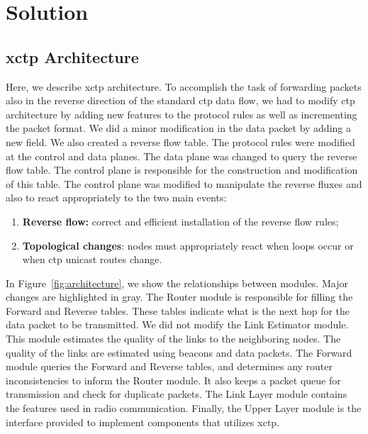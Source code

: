 \section{Solution}
\label{sec:solution}


\subsection{\ac{xctp} Architecture}
\label{sec:architecture}

Here, we describe \ac{xctp} architecture. To accomplish the task of forwarding packets also in the reverse direction of the standard \ac{ctp} data flow, we had to modify \ac{ctp} architecture by adding new features to the protocol rules as well as incrementing the packet format. We did a minor modification in the data packet by adding a new field. We also created a reverse flow table. The protocol rules were modified at the control and data planes. The data plane was changed to query the reverse flow table. The control plane is responsible for the construction and modification of this table. The control plane was modified to manipulate the reverse fluxes and also to react appropriately to the two main events:

\begin{enumerate}
     \item \textbf {Reverse flow:} correct and efficient installation of the reverse flow rules;
     \item \textbf {Topological changes}: nodes must appropriately react when loops occur or when \ac{ctp} unicast routes change.
\end{enumerate}

In Figure~\ref{fig:architecture}, we show the relationships between modules. Major changes are highlighted in gray. The Router module is responsible for filling the Forward and Reverse tables. These tables indicate what is the next hop for the data packet to be transmitted. We did not modify the Link Estimator module. This module estimates the quality of the links to the neighboring nodes. The quality of the links are estimated using beacons and data packets. The Forward module queries the Forward and Reverse tables, and determines any router inconsistencies to inform the Router module. It also keeps a packet queue for transmission and check for duplicate packets. The Link Layer module contains the features used in radio communication. Finally, the Upper Layer module is the interface provided to implement components that utilizes \ac{xctp}.

